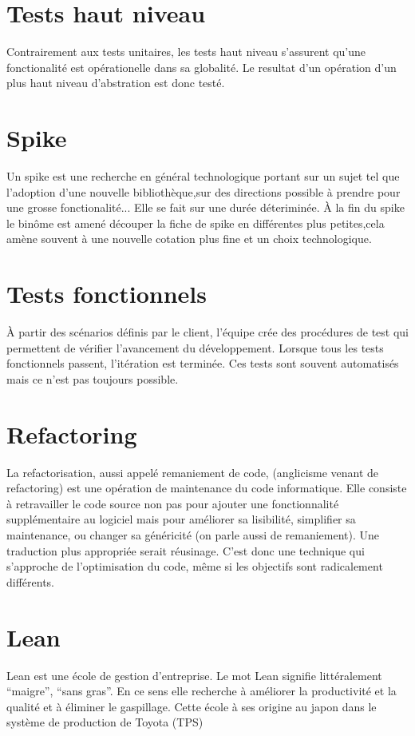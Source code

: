 \section{Tests haut niveau}\label{lexique:testHL}
Contrairement aux tests unitaires, les tests haut niveau s'assurent qu'une fonctionalité est opérationelle dans sa globalité. Le resultat d'un opération d'un plus haut niveau d'abstration est donc testé.

\section{Spike}\label{lexique:spike}
Un spike est une recherche en général technologique portant sur un sujet tel que l'adoption d'une nouvelle bibliothèque,sur des directions possible à prendre pour une grosse fonctionalité... Elle se fait sur une durée déteriminée. À la fin du spike le binôme est amené découper la fiche de spike en différentes plus petites,cela amène souvent à une nouvelle cotation plus fine et un choix technologique.

\section{Tests fonctionnels}\label{lexique:testsFonctionnels}
À partir des scénarios définis par le client, l'équipe crée des procédures de test qui permettent de vérifier l'avancement du développement. Lorsque tous les tests fonctionnels passent, l'itération est terminée. Ces tests sont souvent automatisés mais ce n'est pas toujours possible.

\section{Refactoring}\label{lexique:refactoring}
La refactorisation, aussi appelé remaniement de code, (anglicisme venant de refactoring) est une opération de maintenance du code informatique. Elle consiste à retravailler le code source non pas pour ajouter une fonctionnalité supplémentaire au logiciel mais pour améliorer sa lisibilité, simplifier sa maintenance, ou changer sa généricité (on parle aussi de remaniement). Une traduction plus appropriée serait réusinage. C'est donc une technique qui s'approche de l'optimisation du code, même si les objectifs sont radicalement différents. 

\section{Lean}
Lean est une école de gestion d'entreprise. Le mot Lean signifie littéralement ``maigre'', ``sans gras''. En ce sens elle recherche à améliorer la productivité et la qualité et à éliminer le gaspillage. Cette école à ses origine au japon dans le système de production de Toyota (TPS)

